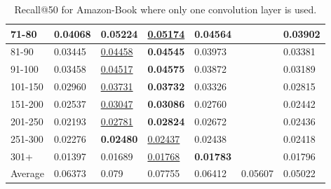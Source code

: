 \begin{table*}[]
\begin{tabular}{|l|l|l|l|l|l|l|}
        71-80     & 0.04068                        & \textbf{0.05224}               & \underline{0.05174}            & 0.04564                        &                                & 0.03902                        \\ \hline
        81-90     & 0.03445                        & \underline{0.04458}            & \textbf{0.04545}               & 0.03973                        &                                & 0.03381                        \\ \hline
        91-100    & 0.03458                        & \underline{0.04517}            & \textbf{0.04575}               & 0.03872                        &                                & 0.03189                        \\ \hline
        101-150   & 0.02960                        & \underline{0.03731}            & \textbf{0.03732}               & 0.03326                        &                                & 0.02815                        \\ \hline
        151-200   & 0.02537                        & \underline{0.03047}            & \textbf{0.03086}               & 0.02760                        &                                & 0.02442                        \\ \hline
        201-250   & 0.02193                        & \underline{0.02781}            & \textbf{0.02824}               & 0.02672                        &                                & 0.02436                        \\ \hline
        251-300   & 0.02276                        & \textbf{0.02480}               & \underline{0.02437}            & 0.02438                        &                                & 0.02418                        \\ \hline
        301+      & 0.01397                        & 0.01689                        & \underline{0.01768}            & \textbf{0.01783}               &                                & 0.01796                        \\ \hline
        Average   & 0.06373                        & 0.079                          & 0.07755                        & 0.06412                        & 0.05607                        & 0.05022                        \\ \hline
    \end{tabular}
    \caption{Recall@50 for Amazon-Book where only one convolution layer is used.}
\end{table*}
